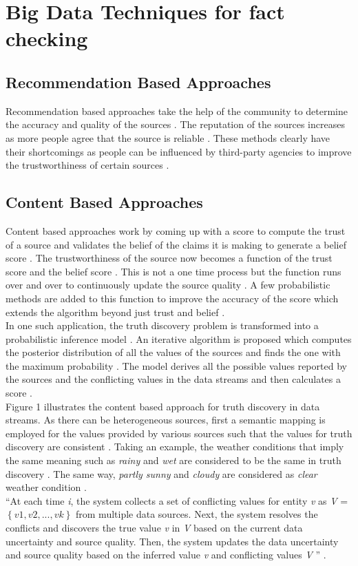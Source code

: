 \documentclass[sigconf]{acmart}
\begin{document}
\section{Big Data Techniques for fact checking}

\subsection{Recommendation Based Approaches}
Recommendation based approaches take the help of the community to determine the accuracy and quality of the sources \cite{Berti-Equille2016}. The reputation of the sources increases as more people agree that the source is reliable \cite{Berti-Equille2016}. These methods clearly have their shortcomings as people can be influenced by third-party agencies to improve the trustworthiness of certain sources \cite{Berti-Equille2016}.

\subsection{Content Based Approaches}
Content based approaches work by coming up with a score to compute the trust of a source and validates the belief of the claims it is making to generate a belief score \cite{Berti-Equille2016}. The trustworthiness of the source now becomes a function of the trust score and the belief score \cite{Berti-Equille2016}. This is not a one time process but the function runs over and over to continuously update the source quality \cite{Berti-Equille2016}. A few probabilistic methods are added to this function to improve the accuracy of the score which extends the algorithm beyond just trust and belief \cite{Berti-Equille2016}. \\ In one such application, the truth discovery problem is transformed into a probabilistic inference model \cite{Zhao2014}. An iterative algorithm is proposed which computes the posterior distribution of all the values of the sources and finds the one with the maximum probability \cite{Zhao2014}. The model derives all the possible values reported by the sources and the conflicting values in the data streams and then calculates a score \cite{Zhao2014}. \\
Figure 1 illustrates the content based approach for truth discovery in data streams. As there can be heterogeneous sources, first a semantic mapping is employed for the values provided by various sources such that the values for truth discovery are consistent \cite{Zhao2014}. Taking an example, the weather conditions that imply the same meaning such as {\em rainy} and {\em wet} are considered to be the same in truth discovery \cite{Zhao2014}. The same way, {\em partly sunny} and {\em cloudy} are considered as {\em clear} weather condition \cite{Zhao2014}. \\
``At each time {\em i}, the system collects a set of conflicting
values for entity {\em v} as {\em V} = $\left\{{v1,v2,...,vk}\right\}$ from multiple data sources. Next, the system resolves the conflicts and discovers the true value {\em v} in {\em V} based on the current data uncertainty and source quality. Then, the system updates the data uncertainty and source quality based on the inferred value {\em v} and conflicting values {\em V} '' \cite{Zhao2014}.
\end{document}
